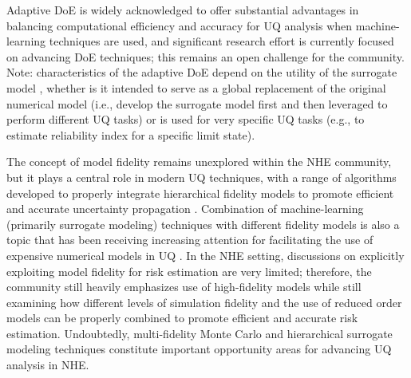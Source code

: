 Adaptive DoE is widely acknowledged to offer substantial advantages in balancing computational efficiency and accuracy for UQ analysis when machine-learning techniques are used, and significant research effort is currently focused on advancing DoE techniques; this remains an open challenge for the community. Note: characteristics of the adaptive DoE depend on the utility of the surrogate model \citep{liu2018survey}, whether is it intended to serve as a global replacement of the original numerical model (i.e., develop the surrogate model first and then leveraged to perform different UQ tasks) or is used for very specific UQ tasks (e.g., to estimate reliability index for a specific limit state). 

The concept of model fidelity remains unexplored within the NHE community, but it plays a central role in modern UQ techniques, with a range of algorithms developed to properly integrate hierarchical fidelity models to promote efficient and accurate uncertainty propagation \citep{geraci2017multifidelity, peherstorfer2018survey}. Combination of machine-learning (primarily surrogate modeling) techniques with different fidelity models is also a topic that has been receiving increasing attention for facilitating the use of expensive numerical models in UQ \citep{debaar2015uncertainty, zhou2016active}. In the NHE setting, discussions on explicitly exploiting model fidelity for risk estimation are very limited; therefore, the community still heavily emphasizes use of high-fidelity models while still examining how different levels of simulation fidelity and the use of reduced order models can be properly combined to promote efficient and accurate risk estimation. Undoubtedly, multi-fidelity Monte Carlo and hierarchical surrogate modeling techniques constitute important opportunity areas for advancing UQ analysis in NHE.

